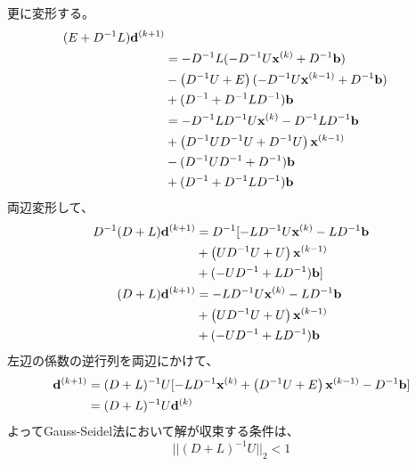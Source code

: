\documentclass[twocolumn]{jsarticle}
\newcommand{\kakko}[1][]{(#1)}
\newcommand{\bx}{\bold{x}}
\newcommand{\bb}{\bold{b}}
\newcommand{\bd}{\bold{d}}
\begin{document}
更に変形する。
\begin{align*}
  (E + D^{-1}L)\bd^{\kakko[k+1]} \\ 
& = - D^{-1}L (- D^{-1} U \bx^{\kakko[k]} + D^{-1}\bold{b})\\
&- \left( D^{-1}U+ E\right) (- D^{-1} U \bx^{\kakko[k-1]} + D^{-1}\bold{b})\\
&+ (D^{-1} + D^{-1} L D^{-1}) \bb\\
&=  - D^{-1}L D^{-1} U \bx^{\kakko[k]} - D^{-1}L D^{-1}\bold{b}\\
&+ \left( D^{-1}UD^{-1} U+ D^{-1} U\right)  \bx^{\kakko[k-1]} \\
&-( D^{-1}UD^{-1} + D^{-1})\bold{b}\\
&+ (D^{-1} + D^{-1} L D^{-1})\bb
\end{align*}
両辺変形して、
\begin{align*}
D^{-1}(D + L)\bd^{\kakko[k+1]} &= D^{-1} [-L D^{-1} U \bx^{\kakko[k]} - L D^{-1}\bold{b}\\
&+ \left( UD^{-1} U+ U\right)  \bx^{\kakko[k-1]} \\
&+(-UD^{-1} + LD^{-1})\bold{b}]\\
(D + L)\bd^{\kakko[k+1]}&= - L D^{-1} U \bx^{\kakko[k]} - L D^{-1}\bold{b}\\
&+ \left( UD^{-1} U+ U\right)  \bx^{\kakko[k-1]} \\
& + (-UD^{-1} + LD^{-1})\bold{b}\\
\end{align*}
左辺の係数の逆行列を両辺にかけて、
\begin{align*}
\bd^{\kakko[k+1]} &= (D + L)^{-1}U[- L D^{-1}  \bx^{\kakko[k]} + \left( D^{-1} U+ E\right) \bx^{\kakko[k-1]}
-D^{-1}\bold{b}]\\
&= (D + L)^{-1}U\bd^{\kakko[k]}\\
\end{align*}
よってGauss-Seidel法において解が収束する条件は、
\begin{equation}
    ||(D + L)^{-1}U||_2 < 1
\end{equation}
\end{document}
